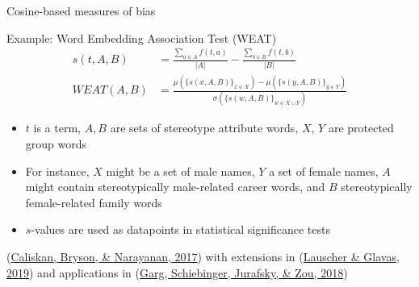 \documentclass[
  10pt,
  ignorenonframetext,
  x11names, dvipsnames, bibspacing,natbib, table]{beamer}
\begin{document}
\begin{frame}{Cosine-based measures of bias}
\protect\hypertarget{cosine-based-measures-of-bias-3}{}
\begin{block}{Example: Word Embedding Association Test (WEAT)}
\protect\hypertarget{example-word-embedding-association-test-weat-1}{}
\begin{align*}
s(t,A,B) & = \frac{\sum_{a\in A}f(t,a)}{\vert A\vert} - \frac{\sum_{b\in B}f(t,b)}{\vert B\vert}
\\
WEAT(A,B) & = \frac{
\mu\left(\{s(x,A,B)\}_{x\in X}\right) -\mu\left(\{s(y,A,B)\}_{y\in Y}\right) 
}{
\sigma\left(\{s(w,A,B)\}_{w\in X\cup Y}\right)
}
\end{align*}

\begin{itemize}
\item
  \(t\) is a term, \(A, B\) are sets of stereotype attribute words,
  \(X\), \(Y\) are protected group words
\item
  For instance, \(X\) might be a set of male names, \(Y\) a set of
  female names, \(A\) might contain stereotypically male-related career
  words, and \(B\) stereotypically female-related family words
\item
  \(s\)-values are used as datapoints in statistical significance tests
\end{itemize}

\footnotesize

\vspace{2mm}

(\protect\hyperlink{ref-Caliskan2017semanticsBiases}{Caliskan, Bryson,
\& Narayanan, 2017}) with extensions in
(\protect\hyperlink{ref-Lauscher2019multidimensional}{Lauscher \&
Glavas, 2019}) and applications in
(\protect\hyperlink{ref-Garg2018years}{Garg, Schiebinger, Jurafsky, \&
Zou, 2018})
\end{block}
\end{frame}
\end{document}
